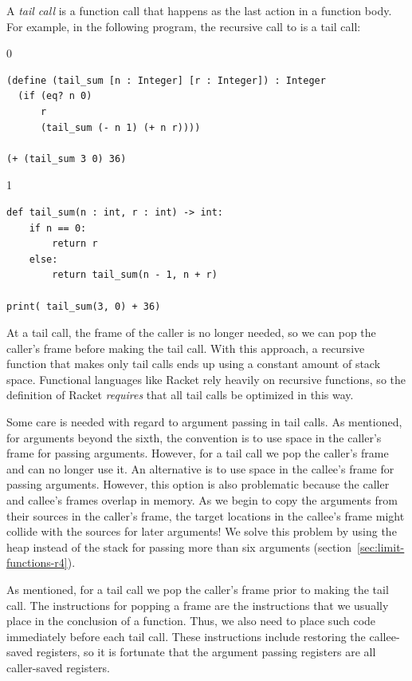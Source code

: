 \documentclass[7x10]{TimesAPriori_MIT}%
\def\racketEd{0}
\def\pythonEd{1}
\def\edition{1}
\newcommand{\pythonColor}[0]{}
\numberwithin{theorem}{chapter}
\numberwithin{definition}{chapter}
\numberwithin{equation}{chapter}
\begin{document}
A \emph{tail call} is a function call that
happens as the last action in a function body.  For example, in the
following program, the recursive call to  is a tail
call:
\begin{center}
{\if\edition\racketEd  
\begin{lstlisting}
(define (tail_sum [n : Integer] [r : Integer]) : Integer
  (if (eq? n 0) 
      r
      (tail_sum (- n 1) (+ n r))))

(+ (tail_sum 3 0) 36)
\end{lstlisting}
\fi}
{\if\edition\pythonEd\pythonColor
\begin{lstlisting}
def tail_sum(n : int, r : int) -> int:
    if n == 0:
        return r
    else:
        return tail_sum(n - 1, n + r)

print( tail_sum(3, 0) + 36)
\end{lstlisting}
\fi}
\end{center}
At a tail call, the frame of the caller is no longer needed, so we can
pop the caller's frame before making the tail call. With this
approach, a recursive function that makes only tail calls ends up 
using a constant amount of stack space.  Functional languages like
Racket rely heavily on recursive functions, so the definition of
Racket \emph{requires} that all tail calls be optimized in this way.

Some care is needed with regard to argument passing in tail calls.  As
mentioned, for arguments beyond the sixth, the convention is to use
space in the caller's frame for passing arguments.  However, for a
tail call we pop the caller's frame and can no longer use it.  An
alternative is to use space in the callee's frame for passing
arguments. However, this option is also problematic because the caller
and callee's frames overlap in memory.  As we begin to copy the
arguments from their sources in the caller's frame, the target
locations in the callee's frame might collide with the sources for
later arguments! We solve this problem by using the heap instead of
the stack for passing more than six arguments
(section~\ref{sec:limit-functions-r4}).

As mentioned, for a tail call we pop the caller's frame prior to
making the tail call. The instructions for popping a frame are the
instructions that we usually place in the conclusion of a
function. Thus, we also need to place such code immediately before
each tail call. These instructions include restoring the callee-saved
registers, so it is fortunate that the argument passing registers are
all caller-saved registers.
\end{document}
